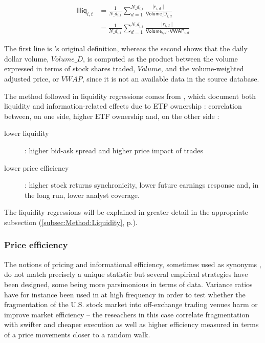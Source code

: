 \begin{equation}
  \begin{split}
    \mathsf{Illiq}_{i, t} & = \frac{1}{N\_d_{i, t}} \sum_{d = 1}^{N\_d_{i, t}} \frac{\mid r_{i, d} \mid}{\mathsf{Volume\_D}_{i, d}}\\
    &  = \frac{1}{N\_d_{i, t}} \sum_{d = 1}^{N\_d_{i, t}} \frac{\mid r_{i, d} \mid}{\mathsf{Volume}_{i, d} \cdot \mathsf{VWAP}_{i, d}}
    \end{split}
\end{equation}

  The first line is \textcite{Amihud2002}'s original definition, whereas the second shows that the daily dollar volume, $Volume\_D$, is computed as the product between the volume expressed in terms of stock shares traded, $Volume$, and the volume-weighted adjusted price, or $VWAP$, since it is not an available data in the source database.
  
The method followed in liquidity regressions comes from \textcite{Israeli2017}, which document both liquidity and information-related effects due to ETF ownership : correlation between, on one side, higher ETF ownership  and, on the other side :
\begin{description}
\item[lower liquidity] : higher bid-ask spread and higher price impact of trades
\item[lower price efficiency] : higher stock returns synchronicity, lower future earnings response and, in the long run, lower analyst coverage.
\end{description}

The liquidity regressions will be explained in greater detail in the appropriate subsection (\autoref{subsec:Method:Liquidity}, p.\pageref{subsec:Method:Liquidity}).
\subsubsection{Price efficiency}
The notions of pricing and informational efficiency, sometimes used as synonyms \parencite{Israeli2017}, do not match precisely a unique statistic but several empirical strategies have been designed, some being more parsimonious in terms of data. Variance ratios have for instance been used in \textcite{OHara2011} at high frequency in order to test whether the fragmentation of the U.S. stock market into off-exchange trading venues harm or improve market efficiency -- the reseachers in this case correlate fragmentation with swifter and cheaper execution as well as higher efficiency measured in terms of a price movements closer to a random  walk. 

